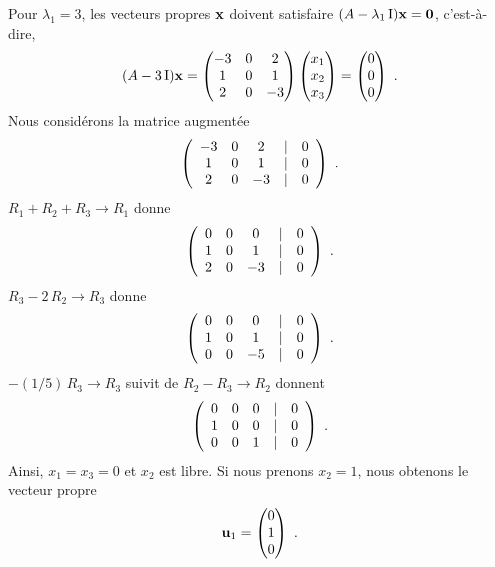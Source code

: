 {Pour $\lambda_1 = 3$, les vecteurs propres $\mathbf{x}$ doivent
satisfaire $(A-\lambda_1\operatorname{I})\mathbf{x}  = \mathbf{0}$, c'est-à-dire,
\[
(A-3 \operatorname{I})\mathbf{x}
= \begin{pmatrix} -3 & 0 & 2 \\1 & 0 & 1\\2 & 0 & -3 \end{pmatrix}
\begin{pmatrix} x_1 \\x_2 \\x_3 \end{pmatrix}
= \begin{pmatrix} 0 \\ 0 \\ 0 \end{pmatrix} \ .
\]
Nous considérons la matrice augmentée
\[
\left(\begin{array}{ccc@{\quad | \quad}c}
-3 & 0 & 2 & 0 \\1 & 0 & 1 & 0 \\2 & 0 & -3 & 0
\end{array}\right) \ .
\]
$R_1+R_2+R_3\rightarrow R_1$ donne
\[
\left(\begin{array}{ccc@{\quad | \quad}c}
0 & 0 & 0 & 0 \\1 & 0 & 1 & 0 \\2 & 0 & -3 & 0
\end{array}\right) \ .
\]
$R_3-2\,R_2 \rightarrow R_3$ donne
\[
\left(\begin{array}{ccc@{\quad | \quad}c}
0 & 0 & 0 & 0 \\1 & 0 & 1 & 0 \\0 & 0 & -5 & 0
\end{array}\right) \ .
\]
$-(1/5)\,R_3\rightarrow R_3$ suivit de $R_2-R_3 \rightarrow R_2$
donnent
\[
\left(\begin{array}{ccc@{\quad | \quad}c}
0 & 0 & 0 & 0 \\1 & 0 & 0 & 0 \\0 & 0 & 1 & 0
\end{array}\right) \ .
\]
Ainsi, $x_1 = x_3 =0$ et $x_2$ est libre.  Si nous prenons $x_2=1$,
nous obtenons le vecteur propre
\[
\mathbf{u}_1 = \begin{pmatrix} 0 \\ 1 \\ 0 \end{pmatrix} \ .
\]

}
